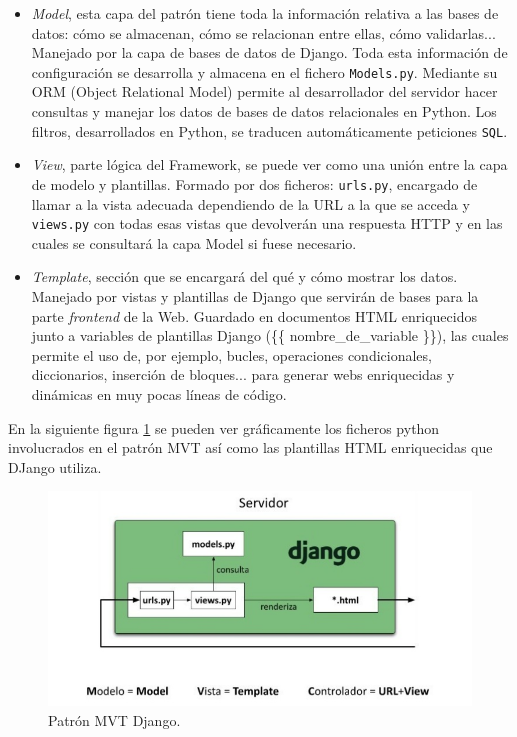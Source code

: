 \documentclass[a4paper, 12pt]{book}
\begin{document}
		\begin{itemize}
			\item \textit{Model}, esta capa del patrón tiene toda la información relativa a las bases de datos: cómo se almacenan, cómo se relacionan entre ellas, cómo validarlas... Manejado por la capa de bases de datos de Django. Toda esta información de configuración se desarrolla y almacena en el fichero \texttt{Models.py}. Mediante su ORM (Object Relational Model) permite al desarrollador del servidor hacer consultas y manejar los datos de bases de datos relacionales en Python. Los filtros, desarrollados en Python, se traducen automáticamente peticiones \texttt{SQL}.
			
			\item \textit{View}, parte lógica del Framework, se puede ver como una unión entre la capa de modelo y plantillas. Formado por dos ficheros: \texttt{urls.py}, encargado de llamar a la vista adecuada dependiendo de la URL a la que se acceda y \texttt{views.py} con todas esas vistas que devolverán una respuesta HTTP y en las cuales se consultará la capa Model si fuese necesario.
			
			
			\item \textit{Template}, sección que se encargará del qué y cómo mostrar los datos. Manejado por vistas y plantillas de Django que servirán de bases para la parte \textit{frontend} de la Web. Guardado en documentos HTML enriquecidos junto a variables de plantillas Django (\{\{ nombre\_de\_variable \}\}), las cuales permite el uso de, por ejemplo, bucles, operaciones condicionales, diccionarios, inserción de bloques... para generar webs enriquecidas y dinámicas en muy pocas líneas de código.
			
		\end{itemize}


		En la siguiente figura \ref{fig:MTV_Django} se pueden ver gráficamente los ficheros python involucrados en el patrón MVT así como las plantillas HTML enriquecidas que DJango utiliza.
		\begin{figure}[H]
			\centering
			\includegraphics[width=13cm, keepaspectratio]{img/django_MTV.png}
			\caption{Patrón MVT Django.}
			\label{fig:MTV_Django}
		\end{figure}
		
\end{document}

